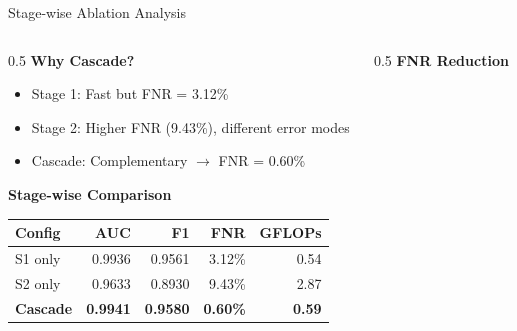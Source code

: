 \documentclass[aspectratio=169,12pt]{beamer}
\newcommand{\highlight}[1]{\textcolor{primaryblue}{\textbf{#1}}}
\newcommand{\successtext}[1]{\textcolor{successgreen}{\textbf{#1}}}
\begin{document}
\begin{frame}{Stage-wise Ablation Analysis}
\footnotesize
\begin{columns}[T]
\begin{column}{0.5\textwidth}
\textbf{Why Cascade?}
\begin{itemize}
\setlength\itemsep{0.02em}
    \item Stage 1: Fast but FNR = 3.12\%
    \item Stage 2: Higher FNR (9.43\%), different error modes
    \item Cascade: Complementary $\rightarrow$ FNR = 0.60\%
\end{itemize}

\vspace{0.1em}
\textbf{Stage-wise Comparison}
\begin{center}
\tiny
\begin{tabular}{lrrrr}
\toprule
\textbf{Config} & \textbf{AUC} & \textbf{F1} & \textbf{FNR} & \textbf{GFLOPs} \\
\midrule
S1 only & 0.9936 & 0.9561 & 3.12\% & 0.54 \\
S2 only & 0.9633 & 0.8930 & 9.43\% & 2.87 \\
\midrule
\textbf{Cascade} & \textbf{0.9941} & \textbf{0.9580} & \successtext{0.60\%} & \highlight{0.59} \\
\bottomrule
\end{tabular}
\end{center}

\end{column}

\begin{column}{0.5\textwidth}
\textbf{FNR Reduction}
\begin{center}
\end{center}
\end{column}
\end{columns}
\end{frame}
\end{document}
